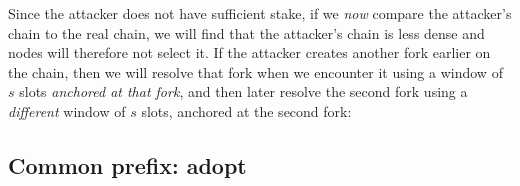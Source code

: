 %
Since the attacker does not have sufficient stake, if we \emph{now} compare the
attacker's chain to the real chain, we will find that the attacker's chain is
less dense and nodes will therefore not select it. If the attacker creates
another fork earlier on the chain, then we will resolve that fork
when we encounter it using a window of $s$ slots \emph{anchored at that fork},
and then later resolve the second fork using a \emph{different} window of
$s$ slots, anchored at the second fork:
%
\begin{center}
\end{center}

\subsection{Common prefix: adopt}
\label{genesis:adopt}

